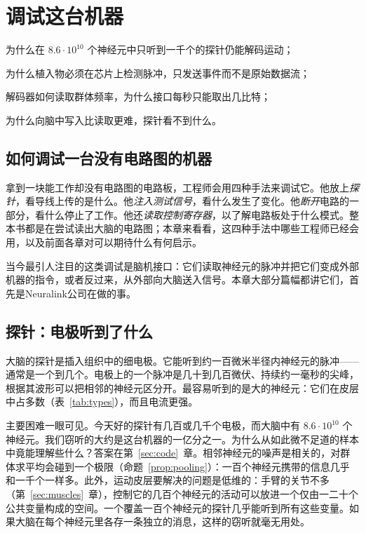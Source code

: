 \chapter{调试这台机器}
\label{sec:debugging}
\begin{chaptergoals}
\item 为什么在 $8.6\cdot10^{10}$ 个神经元中只听到一千个的探针仍能解码运动；
\item 为什么植入物必须在芯片上检测脉冲，只发送事件而不是原始数据流；
\item 解码器如何读取群体频率，为什么接口每秒只能取出几比特；
\item 为什么向脑中写入比读取更难，探针看不到什么。
\end{chaptergoals}

\section{如何调试一台没有电路图的机器}

拿到一块能工作却没有电路图的电路板，工程师会用四种手法来调试它。他放上\emph{探针}，看导线上传的是什么。他\emph{注入测试信号}，看什么发生了变化。他\emph{断开}电路的一部分，看什么停止了工作。他还\emph{读取控制寄存器}，以了解电路板处于什么模式。整本书都是在尝试读出大脑的电路图；本章来看看，这四种手法中哪些工程师已经会用，以及前面各章对可以期待什么有何启示。

当今最引人注目的这类调试是脑机接口：它们读取神经元的脉冲并把它们变成外部机器的指令，或者反过来，从外部向大脑送入信号。本章大部分篇幅都讲它们，首先是Neuralink公司在做的事。

\section{探针：电极听到了什么}

大脑的探针是插入组织中的细电极。它能听到约一百微米半径内神经元的脉冲——通常是一个到几个。电极上的一个脉冲是几十到几百微伏、持续约一毫秒的尖峰，根据其波形可以把相邻的神经元区分开。最容易听到的是大的神经元：它们在皮层中占多数（表~\ref{tab:types}），而且电流更强。

主要困难一眼可见。今天好的探针有几百或几千个电极，而大脑中有 $8.6\cdot10^{10}$ 个神经元。我们窃听的大约是这台机器的一亿分之一。为什么从如此微不足道的样本中竟能理解些什么？答案在第~\ref{sec:code}~章。相邻神经元的噪声是相关的，对群体求平均会碰到一个极限（命题~\ref{prop:pooling}）：一百个神经元携带的信息几乎和一千个一样多。此外，运动皮层要解决的问题是低维的：手臂的关节不多（第~\ref{sec:muscles}~章），控制它的几百个神经元的活动可以放进一个仅由一二十个公共变量构成的空间\cite{Gallego2017}。一个覆盖一百个神经元的探针几乎能听到所有这些变量。如果大脑在每个神经元里各存一条独立的消息，这样的窃听就毫无用处。

